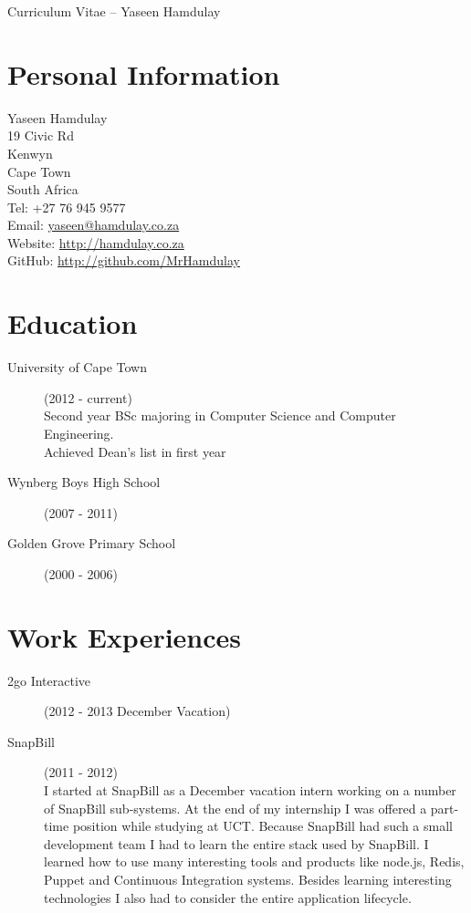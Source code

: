 \documentclass[margin,line,a4paper]{resume}
\begin{document}
    {\sc \Large Curriculum Vitae -- Yaseen Hamdulay}
    \begin{resume}
        \vspace{0.5cm}

        \section{\mysidestyle Personal Information}
            Yaseen Hamdulay\\
            19 Civic Rd\\ %
            Kenwyn\\
            Cape Town\\
            South Africa\\
            Tel: +27 76 945 9577\\
            Email: \href{mailto:yaseen@hamdulay.co.za}{yaseen@hamdulay.co.za}\\
            Website: \href{http://hamdulay.co.za}{http://hamdulay.co.za}\\
            GitHub: \href{http://github.com/MrHamdulay}{http://github.com/MrHamdulay}\\

        \section{\mysidestyle Education}
            \begin{description}
                \item[University of Cape Town] (2012 - current) \\
                    Second year BSc majoring in Computer Science and Computer Engineering. \\
                    Achieved Dean's list in first year
                \item[Wynberg Boys High School] (2007 - 2011)
                \item[Golden Grove Primary School] (2000 - 2006)
            \end{description}

        \section{\mysidestyle Work Experiences}
            \begin{description}
                \item[2go Interactive] (2012 - 2013 December Vacation)
                \item[SnapBill] (2011 - 2012) \\
                    I started at SnapBill as a December vacation intern working on a number of SnapBill sub-systems. At the end of my internship I was offered a part-time position while studying at UCT. Because SnapBill had such a small development team I had to learn the entire stack used by SnapBill. I learned how to use many interesting tools and products like node.js, Redis, Puppet and Continuous Integration systems. Besides learning interesting technologies I also had to
                    consider the entire application lifecycle. 


\end{description}
\end{resume}
\end{document}
